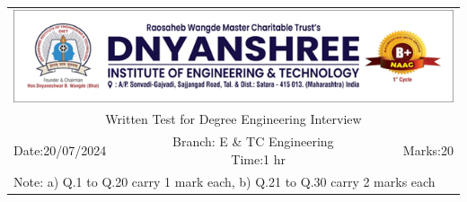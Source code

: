 \documentclass[a4, 12pt, addpoints]{exam}
\begin{document}
\def\arraystretch{1}
\begin{longtable}{lp{}p{}r}
\multicolumn{4}{c}{\includegraphics[width= \textwidth]{dietlogo}} \\ 
\multicolumn{4}{c}{Written Test for Degree Engineering Interview} \\
Date:20/07/2024 & \multicolumn{2}{c}{ ~~~Branch: E \& TC Engineering ~~~~ Time:1 hr} & Marks:20 \\
\multicolumn{4}{l}{ Note: a) Q.1 to Q.20 carry 1 mark each, b) Q.21 to Q.30 carry 2 marks each } \\ \hline
\end{longtable}
\end{document}

